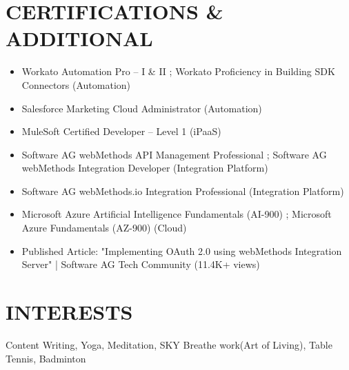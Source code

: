 \documentclass[letterpaper,11pt]{article}
\newcommand{\resumeItem}[1]{
  \item\small{
    {#1 \vspace{-1pt}}
  }
}
\newcommand{\resumeItemListStart}{\begin{itemize}[leftmargin=0.1in]}
\newcommand{\resumeItemListEnd}{\end{itemize}\vspace{-5pt}}
\begin{document}
\section{\color{airforceblue}CERTIFICATIONS \& ADDITIONAL}    
    \resumeItemListStart
        \vspace{0.5pt}
        \resumeItem{\normalsize{Workato Automation Pro – I \& II ; Workato Proficiency in Building SDK Connectors (Automation)}}
        \vspace{-5pt}
        
        \resumeItem{\normalsize{Salesforce Marketing Cloud Administrator (Automation)}}
        \vspace{-5pt}

        \resumeItem{\normalsize{MuleSoft Certified Developer – Level 1 (iPaaS)}}
        \vspace{-5pt}

        \resumeItem{\normalsize{Software AG webMethods API Management Professional ; Software AG webMethods Integration Developer (Integration Platform)}}
        \vspace{-5pt}

        \resumeItem{\normalsize{Software AG webMethods.io Integration Professional (Integration Platform)}}
        \vspace{-5pt}

        \resumeItem{\normalsize{Microsoft Azure Artificial Intelligence Fundamentals (AI-900) ; Microsoft Azure Fundamentals (AZ-900) (Cloud)}}
        \vspace{-5pt}

        \resumeItem{\normalsize{Published Article: "Implementing OAuth 2.0 using webMethods Integration Server" | Software AG Tech Community (11.4K+ views)}}
        
    \resumeItemListEnd  
   
 \vspace{-12pt}

\section{\color{airforceblue}INTERESTS}
 \begin{itemize}[leftmargin=0in, label={}]
    \small{\item{
     \normalsize{Content Writing, Yoga, Meditation, SKY Breathe work(Art of Living), Table Tennis, Badminton}
    }}
 \end{itemize}
\end{document}
